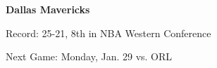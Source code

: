 \textbf{Dallas Mavericks}

Record: 25-21, 8th in NBA Western Conference

Next Game: Monday, Jan. 29 vs. ORL